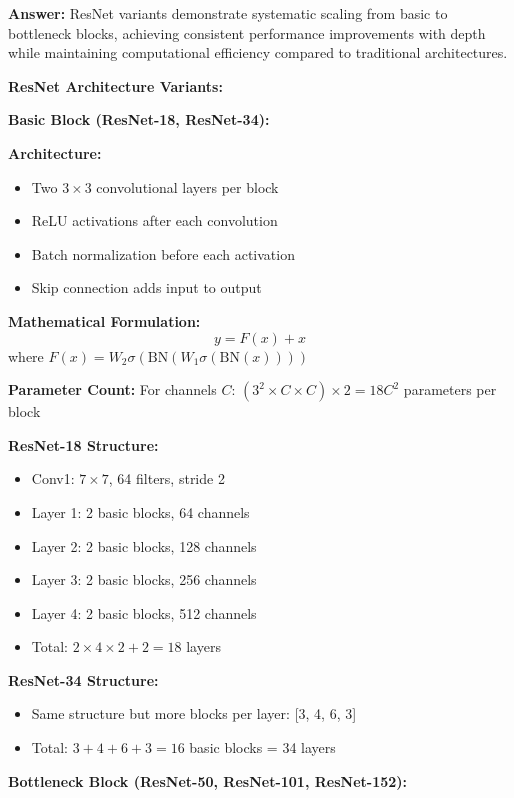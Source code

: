 \documentclass[12pt]{article}
\newcommand{\answer}[1]{{\color{answercolor}\textbf{Answer:} #1}}
\newcommand{\explanation}[1]{{\color{explanationcolor}#1}}
\begin{document}
\begin{enumerate}[(a)]
    \answer{ResNet variants demonstrate systematic scaling from basic to bottleneck blocks, achieving consistent performance improvements with depth while maintaining computational efficiency compared to traditional architectures.}
    
    \explanation{
    \textbf{ResNet Architecture Variants:}
    
    \textbf{Basic Block (ResNet-18, ResNet-34):}
    
    \textbf{Architecture:}
    \begin{itemize}
        \item Two $3 \times 3$ convolutional layers per block
        \item ReLU activations after each convolution
        \item Batch normalization before each activation
        \item Skip connection adds input to output
    \end{itemize}
    
    \textbf{Mathematical Formulation:}
    $$y = F(x) + x$$
    where $F(x) = W_2 \sigma(\text{BN}(W_1 \sigma(\text{BN}(x))))$
    
    \textbf{Parameter Count:}
    For channels $C$: $(3^2 \times C \times C) \times 2 = 18C^2$ parameters per block
    
    \textbf{ResNet-18 Structure:}
    \begin{itemize}
        \item Conv1: $7 \times 7$, 64 filters, stride 2
        \item Layer 1: 2 basic blocks, 64 channels
        \item Layer 2: 2 basic blocks, 128 channels  
        \item Layer 3: 2 basic blocks, 256 channels
        \item Layer 4: 2 basic blocks, 512 channels
        \item Total: $2 \times 4 \times 2 + 2 = 18$ layers
    \end{itemize}
    
    \textbf{ResNet-34 Structure:}
    \begin{itemize}
        \item Same structure but more blocks per layer: [3, 4, 6, 3]
        \item Total: $3 + 4 + 6 + 3 = 16$ basic blocks = 34 layers
    \end{itemize}
    
    \textbf{Bottleneck Block (ResNet-50, ResNet-101, ResNet-152):}
    
}
\end{enumerate}
\end{document}
